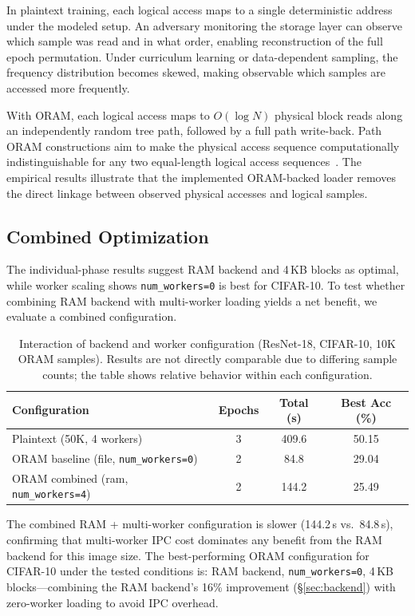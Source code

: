 \documentclass{llncs}
\begin{document}
In plaintext training, each logical access maps to a single deterministic address under the modeled setup.
An adversary monitoring the storage layer can observe which sample was read and in what order, enabling reconstruction of the full epoch permutation.
Under curriculum learning or data-dependent sampling, the frequency distribution becomes skewed, making observable which samples are accessed more frequently.

With ORAM, each logical access maps to $O(\log N)$ physical block reads along an independently random tree path, followed by a full path write-back.
Path ORAM constructions aim to make the physical access sequence computationally indistinguishable for any two equal-length logical access sequences~\cite{stefanov2013}.
The empirical results illustrate that the implemented ORAM-backed loader removes the direct linkage between observed physical accesses and logical samples.

\subsection{Combined Optimization}

The individual-phase results suggest RAM backend and 4\,KB blocks as optimal, while worker scaling shows \texttt{num\_workers=0} is best for CIFAR-10.
To test whether combining RAM backend with multi-worker loading yields a net benefit, we evaluate a combined configuration.

\begin{table}[t]
\centering
\caption{Interaction of backend and worker configuration (ResNet-18, CIFAR-10, 10K ORAM samples). Results are not directly comparable due to differing sample counts; the table shows relative behavior within each configuration.}
\label{tab:combined}
\small
\begin{tabular}{@{}lccc@{}}
\toprule
\textbf{Configuration} & \textbf{Epochs} & \textbf{Total (s)} & \textbf{Best Acc (\%)} \\
\midrule
Plaintext (50K, 4 workers)       & 3 & 409.6 & 50.15 \\
ORAM baseline (file, \texttt{num\_workers=0})        & 2 & 84.8  & 29.04 \\
ORAM combined (ram, \texttt{num\_workers=4})         & 2 & 144.2 & 25.49 \\
\bottomrule
\end{tabular}
\end{table}

The combined RAM + multi-worker configuration is slower (144.2\,s vs.\ 84.8\,s), confirming that multi-worker IPC cost dominates any benefit from the RAM backend for this image size.
The best-performing ORAM configuration for CIFAR-10 under the tested conditions is: RAM backend, \texttt{num\_workers=0}, 4\,KB blocks---combining the RAM backend's 16\% improvement (\S\ref{sec:backend}) with zero-worker loading to avoid IPC overhead.
\end{document}
